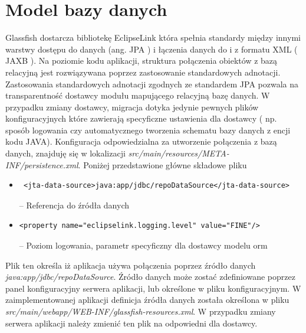 \section{Model bazy danych}
Glassfish dostarcza bibliotekę EclipseLink która spełnia standardy między innymi warstwy dostępu do danych (ang. JPA ) i łączenia danych do i z formatu XML ( JAXB ). Na poziomie kodu aplikacji, struktura połączenia obiektów z bazą relacyjną jest rozwiązywana poprzez zastosowanie standardowych adnotacji. Zastosowania standardowych adnotacji zgodnych ze standardem JPA pozwala na transparentność dostawcy modułu mapującego relacyjną bazę danych. W przypadku zmiany dostawcy, migracja dotyka jedynie pewnych plików konfiguracyjnych które zawierają specyficzne ustawienia dla dostawcy ( np. sposób logowania czy automatycznego tworzenia schematu bazy danych z encji kodu JAVA).
Konfiguracja odpowiedzialna za utworzenie połączenia z bazą danych, znajduję się w lokalizacji \textit{src/main/resources/META-INF/persistence.xml}. Poniżej przedstawione główne składowe pliku

\begin{itemize}
	\item  {\footnotesize \begin{verbatim} <jta-data-source>java:app/jdbc/repoDataSource</jta-data-source> \end{verbatim}} -- Referencja do źródła danych
 	\item  {\footnotesize \begin{verbatim}<property name="eclipselink.logging.level" value="FINE"/>\end{verbatim}} -- Poziom logowania, parametr specyficzny dla dostawcy modelu orm
\end{itemize}


Plik ten określa iż aplikacja używa połączenia poprzez źródło danych \textit{java:app/jdbc/repoDataSource}. Źródło danych może zostać zdefiniowane poprzez panel konfiguracyjny serwera aplikacji, lub określone w pliku konfiguracyjnym. W zaimplementowanej aplikacji definicja źródła danych została określona w pliku \textit{src/main/webapp/WEB-INF/glassfish-resources.xml}. W przypadku zmiany serwera aplikacji należy zmienić ten plik na odpowiedni dla dostawcy.


